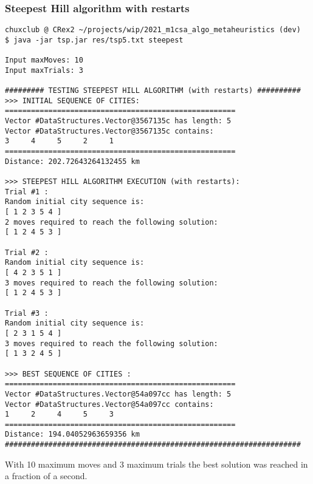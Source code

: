 \documentclass[./standalone.tex]{subfiles}
\begin{document}
	\subsubsection{Steepest Hill algorithm with restarts}
	\begin{lstlisting}[style=Java, caption={Bash output of the execution of the steepest hill algorithm on the tsp5.txt instance}]
chuxclub @ CRex2 ~/projects/wip/2021_m1csa_algo_metaheuristics (dev)
$ java -jar tsp.jar res/tsp5.txt steepest

Input maxMoves: 10
Input maxTrials: 3

######### TESTING STEEPEST HILL ALGORITHM (with restarts) ########## 
>>> INITIAL SEQUENCE OF CITIES: 
===================================================== 
Vector #DataStructures.Vector@3567135c has length: 5
Vector #DataStructures.Vector@3567135c contains: 
3     4     5     2     1 
===================================================== 
Distance: 202.72643264132455 km

>>> STEEPEST HILL ALGORITHM EXECUTION (with restarts): 
Trial #1 :
Random initial city sequence is: 
[ 1 2 3 5 4 ]
2 moves required to reach the following solution:
[ 1 2 4 5 3 ]

Trial #2 :
Random initial city sequence is: 
[ 4 2 3 5 1 ]
3 moves required to reach the following solution:
[ 1 2 4 5 3 ]

Trial #3 :
Random initial city sequence is: 
[ 2 3 1 5 4 ]
3 moves required to reach the following solution:
[ 1 3 2 4 5 ]

>>> BEST SEQUENCE OF CITIES : 
===================================================== 
Vector #DataStructures.Vector@54a097cc has length: 5
Vector #DataStructures.Vector@54a097cc contains: 
1     2     4     5     3 
===================================================== 
Distance: 194.04052963659356 km
####################################################################
	\end{lstlisting}
With 10 maximum moves and 3 maximum trials the best solution was reached in a fraction of a second.

\newpage
\end{document}
